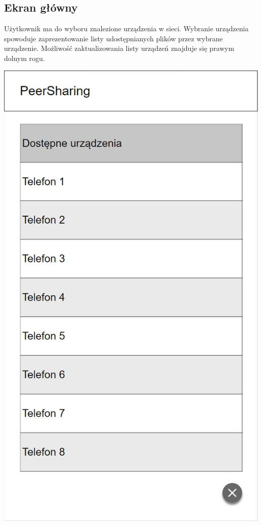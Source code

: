 \documentclass[12pt,a4paper]{article}
\begin{document}
\subsection{Ekran główny}
Użytkownik ma do wyboru znalezione urządzenia w sieci. Wybranie urządzenia spowoduje zaprezentowanie listy udostępnianych plików przez wybrane urządzenie. Możliwość zaktualizowania listy urządzeń znajduje się prawym dolnym rogu.
\begin{center}
\includegraphics[scale=0.6]{1.JPG}
\end{center}
\end{document}
